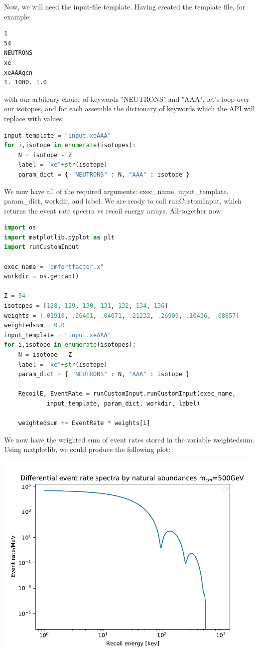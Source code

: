 \documentclass[11pt]{article}
\begin{document}
Now, we will need the input-file template. Having created the template file, for
example:
\begin{verbatim}
1
54
NEUTRONS
xe
xeAAAgcn
1. 1000. 1.0
\end{verbatim}
with our arbitrary choice of keywords "NEUTRONS" and "AAA", 
let's loop over our isotopes, and for each assemble the dictionary of
keywords which the API will replace with values:
\begin{lstlisting}[language=python]
input_template = "input.xeAAA"
for i,isotope in enumerate(isotopes):
    N = isotope - Z
    label = "xe"+str(isotope)
    param_dict = { "NEUTRONS" : N, "AAA" : isotope }
\end{lstlisting}
We now have all of the required arguments: exec\_name, input\_template,
param\_dict, workdir, and label. We are ready to call runCustomInput, which
returns the event rate spectra vs recoil energy arrays. All-together now:
\begin{lstlisting}[language=python]
import os
import matplotlib.pyplot as plt
import runCustomInput

exec_name = "dmfortfactor.x"
workdir = os.getcwd()

Z = 54
isotopes = [128, 129, 130, 131, 132, 134, 136]
weights = [.01910, .26401, .04071, .21232, .26909, .10436, .08857]
weightedsum = 0.0
input_template = "input.xeAAA"
for i,isotope in enumerate(isotopes):
    N = isotope - Z
    label = "xe"+str(isotope)
    param_dict = { "NEUTRONS" : N, "AAA" : isotope }

    RecoilE, EventRate = runCustomInput.runCustomInput(exec_name,
            input_template, param_dict, workdir, label)

    weightedsum += EventRate * weights[i]    
\end{lstlisting}
We now have the weighted sum of event rates stored in the variable weightedsum.
Using matplotlib, we could produce the following plot:

{
	\centering
\includegraphics[width=\textwidth]{weightedspectra.pdf}

}
\end{document}

